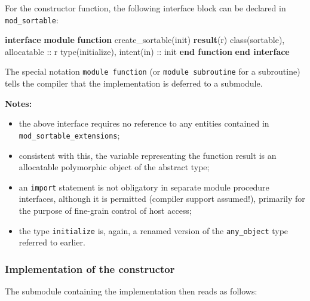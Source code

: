 \documentclass[
  paper=a4,
  ,captions=tableheading
]{scrartcl}
\newenvironment{Shaded}{\begin{snugshade}}{\end{snugshade}}
\newcommand{\DataTypeTok}[1]{\textcolor[rgb]{0.13,0.29,0.53}{#1}}
\newcommand{\KeywordTok}[1]{\textcolor[rgb]{0.13,0.29,0.53}{\textbf{#1}}}
\newcommand{\NormalTok}[1]{#1}
\providecommand{\tightlist}{%
  \setlength{\itemsep}{0pt}\setlength{\parskip}{0pt}}
\begin{document}
For the constructor function, the following interface block can be
declared in \texttt{mod\_sortable}:

\begin{Shaded}
\begin{Highlighting}[]
\KeywordTok{interface}
  \KeywordTok{module} \KeywordTok{function}\NormalTok{ create\_sortable(init) }\KeywordTok{result}\NormalTok{(r)}
    \DataTypeTok{class(sortable)}\NormalTok{, }\DataTypeTok{allocatable} \DataTypeTok{::}\NormalTok{ r}
    \DataTypeTok{type(initialize)}\NormalTok{, }\DataTypeTok{intent(in)} \DataTypeTok{::}\NormalTok{ init}
  \KeywordTok{end function}
\KeywordTok{end interface}
\end{Highlighting}
\end{Shaded}

The special notation \texttt{module\ function} (or
\texttt{module\ subroutine} for a subroutine) tells the compiler that
the implementation is deferred to a submodule.

\textbf{Notes:}

\begin{itemize}
\tightlist
\item
  the above interface requires no reference to any entities contained in
  \texttt{mod\_sortable\_extensions};
\item
  consistent with this, the variable representing the function result is
  an allocatable polymorphic object of the abstract type;
\item
  an \texttt{import} statement is not obligatory in separate module
  procedure interfaces, although it is permitted (compiler support
  assumed!), primarily for the purpose of fine-grain control of host
  access;
\item
  the type \texttt{initialize} is, again, a renamed version of the
  \texttt{any\_object} type referred to earlier.
\end{itemize}

\subsubsection{Implementation of the
constructor}\label{implementation-of-the-constructor}

The submodule containing the implementation then reads as follows:
\end{document}
